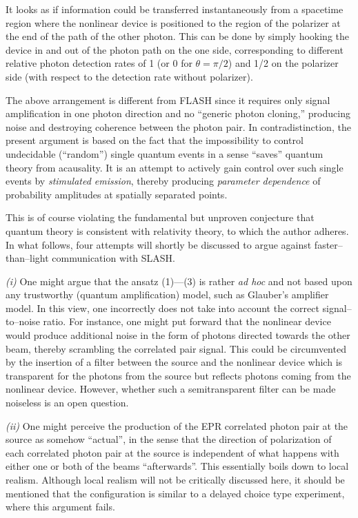       It looks as if information could be transferred instantaneously
 from a spacetime region where the nonlinear device is positioned to
 the region of the polarizer at the end of the path of the other
 photon.  This can be done by simply hooking the device in and out of
 the photon path on the one side, corresponding to different relative
 photon detection rates of 1 (or 0 for $\theta =\pi /2$) and 1/2 on the
 polarizer side (with respect to the detection rate without polarizer).

      The above arrangement is different from FLASH \cite{herbert} since
 it requires only signal amplification in one photon direction and no
 ``generic photon cloning,'' producing
 noise and destroying coherence between the photon pair.
 In contradistinction, the present argument is based on
 the fact that the impossibility to control undecidable (``random'')
 single quantum events in a sense ``saves'' quantum theory from
 acausality.  It is an attempt to actively gain control over such
 single events by {\em stimulated emission}, thereby producing {\sl parameter
 dependence} of probability amplitudes at spatially separated points.

This is of course violating the fundamental but unproven conjecture
 that quantum theory is consistent with relativity theory,
to which the author adheres.
In what follows, four attempts will
 shortly be discussed to argue against faster--than--light
 communication with SLASH.

      {\it (i)} One might argue that the ansatz (1)---(3) is rather {\it ad hoc}
and  not based
 upon any trustworthy (quantum amplification) model, such as Glauber's
 amplifier model.  In this view, one incorrectly does not take into account
 the correct signal--to--noise ratio.  For
 instance, one might put forward that the nonlinear device would
 produce additional noise in the form of photons directed towards the
 other beam, thereby scrambling the correlated pair signal.  This could
 be circumvented by the insertion of a filter between the source and
 the nonlinear device which is transparent for the photons from the
 source but reflects photons coming from the nonlinear device.
 However, whether such a semitransparent filter can be made noiseless
 is an open question.

 {\it (ii)}
 One might perceive the production of the EPR correlated photon pair at
 the source as somehow ``actual'', in the sense that the
 direction of polarization of each correlated photon pair at the source
 is independent of what happens with either one or both of the beams
 ``afterwards''. This essentially boils down to local realism.
 Although local realism will not be critically discussed here, it
 should be mentioned that
 the configuration is similar to a delayed choice type experiment,
 where this argument fails.


